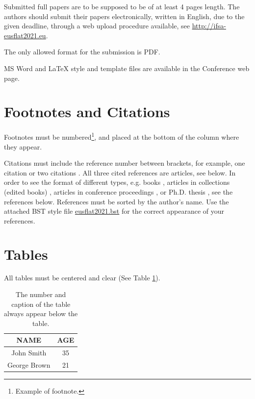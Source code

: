 \documentclass{eusflat2021}
\begin{document}
Submitted full papers are to be supposed to be of at least 4 pages length. The authors should submit their papers electronically, written in English, due to the given deadline, through a web upload procedure available, see \mbox{\url{http://ifsa-eusflat2021.eu}}.

The only allowed format for the submission is PDF.

MS Word and LaTeX{} style and template files are available in the Conference web page.

\section{Footnotes and Citations}

Footnotes must be numbered\footnote{Example of footnote.}, and placed at the bottom of the column where they appear.

Citations must include the reference number between brackets, for example, one citation \cite{Zadeh75} or two citations \cite{Zadeh75b,Zadeh75c}. All three cited references are articles, see below. In order to see the format of different types, e.g. books \cite{Gottwald93,NovakPerfilievaMockor99,KlementMesiarPap00}, articles in collections (edited books) \cite{BandlerKohout80b,NavaraPetrik_EUSFLAT07}, articles in conference proceedings \cite{DuboisNakata_IFSA97}, or Ph.D. thesis \cite{EsterPhD}, see the references below. References must be sorted by the author's name. Use the attached BST style file \url{eusflat2021.bst} for the correct appearance of your references.

\section{Tables}

All tables must be centered and clear (See Table \ref{table}).
\begin{table}[ht]
\begin{center}
\vspace{1ex}
\begin{tabular}{|c|c|} \hline
    {\bf NAME} & {\bf AGE} \\\hline
    John Smith &   35\\
    George Brown & 21 \\ \hline
\end{tabular}
\caption{\label{table}The number and caption of the table always appear below the table.}
\end{center}
\end{table}
\end{document}
